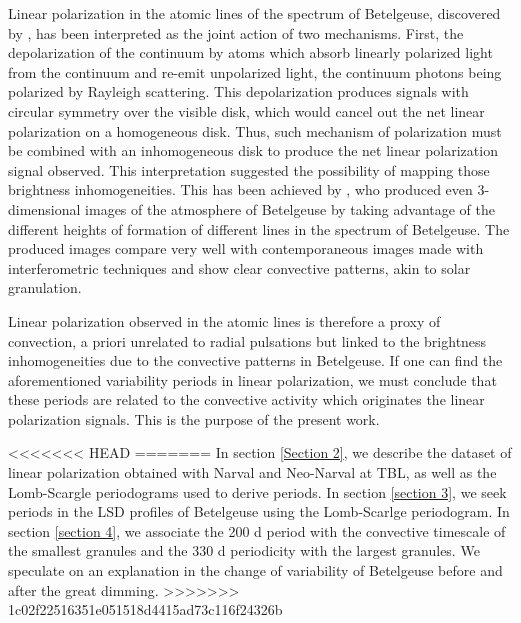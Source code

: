 \documentclass{aa}
\begin{document}
Linear polarization in the atomic lines of the spectrum of Betelgeuse, discovered by \cite{auriere_discovery_2016}, has been interpreted as the joint action of 
two mechanisms. First, the depolarization of the continuum by atoms which absorb linearly polarized light from the continuum and re-emit unpolarized light,
the continuum photons being polarized by Rayleigh scattering. This depolarization produces signals with circular symmetry over the visible disk, which would  cancel out the net linear polarization on a homogeneous disk. Thus, such mechanism of polarization must be combined with an inhomogeneous disk to produce the net linear polarization 
signal observed. This interpretation suggested the possibility of mapping those brightness inhomogeneities. This has been achieved by \cite{lopez_ariste_convective_2018}, who produced even 3-dimensional images of the atmosphere of Betelgeuse \citep{lopez_ariste_three-dimensional_2022} by taking advantage of the different heights of formation of 
different lines in the spectrum of Betelgeuse. The produced images compare very well with contemporaneous images made with interferometric 
techniques \citep{montarges_close_2016} and show clear convective patterns, akin to solar granulation.\

Linear polarization observed in the atomic lines is therefore a proxy of convection, a priori unrelated to radial 
pulsations but linked to the brightness inhomogeneities due to the convective patterns in Betelgeuse. If one can find the aforementioned variability periods 
in linear polarization, we must conclude that these periods are related to the convective activity which originates the linear polarization signals.
This is the purpose of the present work.\

<<<<<<< HEAD
=======
In section \ref{Section 2}, we describe the dataset of linear polarization obtained with Narval and Neo-Narval at TBL, as well as the Lomb-Scargle periodograms used to derive periods. In section \ref{section 3}, we seek periods in the LSD profiles of Betelgeuse using the Lomb-Scarlge periodogram. In section \ref{section 4}, we associate the 200 d period with the convective timescale of the smallest granules and the 330 d periodicity with the largest granules. We speculate on an explanation in the change of variability of Betelgeuse before and after the great dimming. 
>>>>>>> 1c02f22516351e051518d4415ad73c116f24326b
\end{document}
